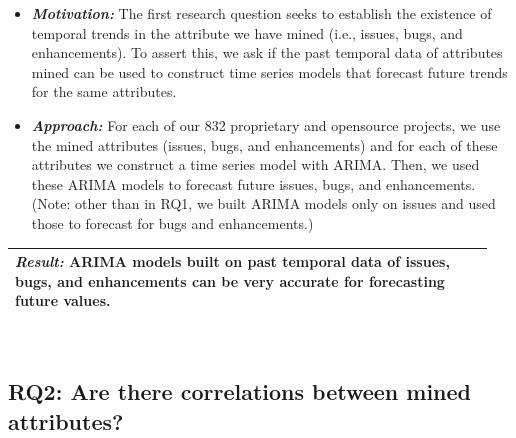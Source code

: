\documentclass[sigconf, preprint]{acmart}
\begin{document}
\begin{itemize}[leftmargin=-1pt]
	
	\item[] \textit{\textbf{Motivation:}} The first research question seeks to establish the existence of temporal trends in the attribute we have mined (i.e., issues, bugs, and enhancements). To assert this, we ask if the past temporal data of attributes mined can be used to construct time series models that forecast future trends for the same attributes.
	
	\item[] \textit{\textbf{Approach:}} For each of our 832 proprietary and 
	opensource 
	projects, we use the mined attributes (issues, bugs, and enhancements) and for each of these attributes we 
	construct a time series model with ARIMA. Then, we used these ARIMA models 
	to forecast future issues, bugs, and enhancements. (Note: other than in RQ1, 
	we built ARIMA models only on issues and used those to forecast for bugs and 
	enhancements.)\\[-.2cm]
	
\end{itemize}

\noindent\begin{minipage}{\linewidth}
	\begin{center}
		\begin{tabular}{p{0.95\linewidth}}
			\arrayrulecolor{Gray}
			\hline
			 
			\rowcolor{Gray} \textit{\textbf{Result:}} ARIMA models built on past 
	temporal data of issues, bugs, and enhancements can be very accurate for 
	forecasting future values.\\\hline
		\end{tabular}
	\end{center}
\end{minipage}\bigstrut[t]\\[-.2cm]


\subsection*{\bf{RQ2: Are there correlations between mined attributes?}}
\end{document}
